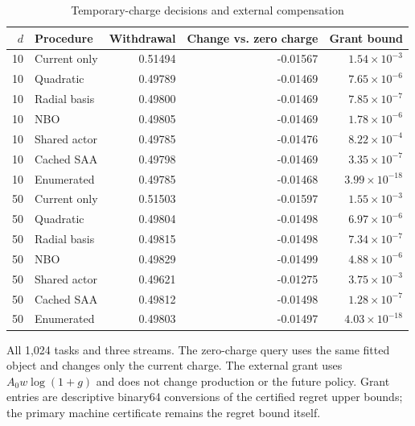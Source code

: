 \begin{table}[htbp]
\centering\small
\caption{Temporary-charge decisions and external compensation}\label{tab:r19economic}
\begin{tabular}{rlrrr}
\toprule
$d$ & Procedure & Withdrawal & Change vs. zero charge & Grant bound\\
\midrule
10 & Current only & 0.51494 & -0.01567 & $1.54\times10^{-3}$\\
10 & Quadratic & 0.49789 & -0.01469 & $7.65\times10^{-6}$\\
10 & Radial basis & 0.49800 & -0.01469 & $7.85\times10^{-7}$\\
10 & NBO & 0.49805 & -0.01469 & $1.78\times10^{-6}$\\
10 & Shared actor & 0.49785 & -0.01476 & $8.22\times10^{-4}$\\
10 & Cached SAA & 0.49798 & -0.01469 & $3.35\times10^{-7}$\\
10 & Enumerated & 0.49785 & -0.01468 & $3.99\times10^{-18}$\\
50 & Current only & 0.51503 & -0.01597 & $1.55\times10^{-3}$\\
50 & Quadratic & 0.49804 & -0.01498 & $6.97\times10^{-6}$\\
50 & Radial basis & 0.49815 & -0.01498 & $7.34\times10^{-7}$\\
50 & NBO & 0.49829 & -0.01499 & $4.88\times10^{-6}$\\
50 & Shared actor & 0.49621 & -0.01275 & $3.75\times10^{-3}$\\
50 & Cached SAA & 0.49812 & -0.01498 & $1.28\times10^{-7}$\\
50 & Enumerated & 0.49803 & -0.01497 & $4.03\times10^{-18}$\\
\bottomrule
\end{tabular}
\par\smallskip\begin{minipage}{.96\textwidth}\footnotesize All 1,024 tasks and three streams. The zero-charge query uses the same fitted object and changes only the current charge. The external grant uses $A_0w\log(1+g)$ and does not change production or the future policy. Grant entries are descriptive binary64 conversions of the certified regret upper bounds; the primary machine certificate remains the regret bound itself.\end{minipage}
\end{table}
